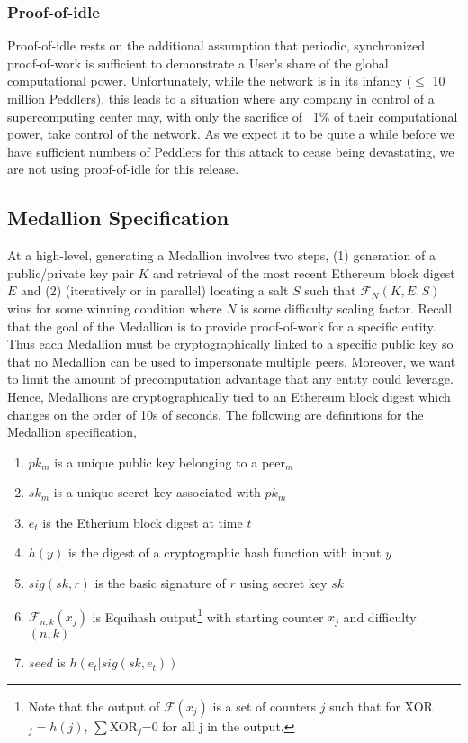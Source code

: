 \subsubsection*{Proof-of-idle}

Proof-of-idle rests on the additional assumption that periodic, synchronized proof-of-work is sufficient to demonstrate a User’s share of the global computational power. Unfortunately, while the network is in its infancy ($\leq$ 10 million Peddlers), this leads to a situation where any company in control of a supercomputing center may, with only the sacrifice of ~1\% of their computational power, take control of the network. As we expect it to be quite a while before we have sufficient numbers of Peddlers for this attack to cease being devastating, we are not using proof-of-idle for this release.

\subsection{Medallion Specification}
\label{medallion-spec}

At a high-level, generating a Medallion involves two steps, (1) generation of a public/private key pair $K$ and retrieval of the most recent Ethereum block digest $E$ and (2) (iteratively or in parallel) locating a salt $S$ such that $\mathcal{F}_{N}(K, E, S)$ wins for some winning condition where $N$ is some difficulty scaling factor. Recall that the goal of the Medallion is to provide proof-of-work for a specific entity. Thus each Medallion must be cryptographically linked to a specific public key so that no Medallion can be used to impersonate multiple peers. Moreover, we want to limit the amount of precomputation advantage that any entity could leverage. Hence, Medallions are cryptographically tied to an Ethereum block digest which changes on the order of 10s of seconds. The following are definitions for the Medallion specification,

\begin{enumerate}
	\item[] $pk_m$ is a unique public key belonging to a peer$_m$
    \item[] $sk_m$ is a unique secret key associated with $pk_m$
    \item[] $e_t$ is the Etherium block digest at time $t$ 
    \item[] $h(y)$ is the digest of a cryptographic hash function with input $y$
    \item[] $sig(sk, r)$ is the basic signature of $r$ using secret key $sk$
    \item[] $\mathcal{F}_{n,k}(x_j)$ is Equihash output\footnote{Note that the output of $\mathcal{F}(x_j)$ is a set of counters $j$ such that for XOR$_j=h(j)$, $\sum$XOR$_j$=0 for all j in the output.} with starting counter $x_j$ and difficulty $(n,k)$
    \item[] $seed$ is $h(e_t|sig(sk,e_t))$
\end{enumerate}

